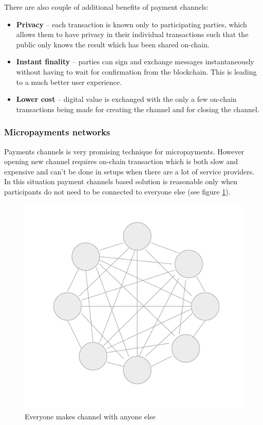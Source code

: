 \documentclass[a4paper,12pt]{article}
\begin{document}
There are also couple of additional benefits of payment channels:

\begin{itemize}
    \item \textbf{Privacy} -- each transaction is known only to participating 
    parties, which allows them to have privacy in their individual transactions 
    such that the public only knows the result which has been shared on-chain.
    \item \textbf{Instant finality} -- parties can sign and exchange messages
    instantaneously without having to wait for confirmation from the blockchain.
    This is leading to a much better user experience.
    \item \textbf{Lower cost} -- digital value is exchanged with the only a few
    on-chain transactions being made for creating the channel and for closing
    the channel.
\end{itemize}

\subsubsection{Micropayments networks}

Payments channels is very promising technique for micropayments. However opening 
new channel requires on-chain transaction which is both slow and expensive and 
can't be done in setups when there are a lot of service providers. In this 
situation payment channels based solution is reasonable only when participants 
do not need to be connected to everyone else (see figure \ref{img:many-to-many}). 

\begin{figure}[H]
    \centering
    \includegraphics[scale=0.5]{../img/many-to-many}
    \caption{Everyone makes channel with anyone else}
    \label{img:many-to-many}
\end{figure}
\end{document}
